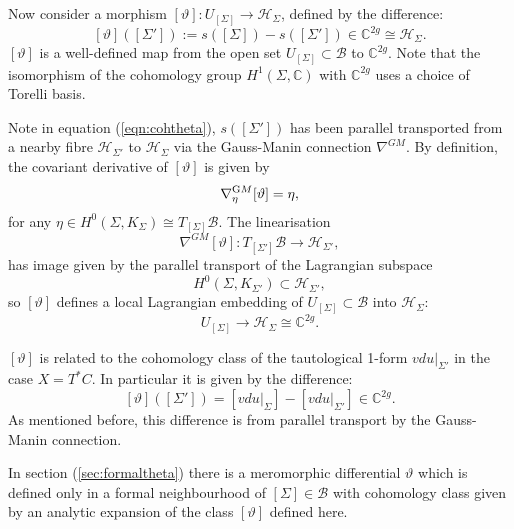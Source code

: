     Now consider a morphism \([\vartheta]:U_{[\Sigma]}\rightarrow \mathcal{H}_\Sigma\), defined by the difference:
    \begin{equation}  
    \label{eqn:cohtheta}
    [\vartheta]([\Sigma']):=s([\Sigma])-s([\Sigma'])\in\mathbb{C}^{2g}\cong \mathcal{H}_\Sigma.
    \end{equation}
    \( [\vartheta ]\) is a well-defined map from  the open set \(U_{[\Sigma]}\subset\mathcal{B}\) to \(\mathbb{C}^{2g}\). Note that the isomorphism of the cohomology group \(H^1(\Sigma, \mathbb{C})\) with \( \mathbb{C}^{2g}\) uses a choice of Torelli basis. 
    
    Note in equation (\ref{eqn:cohtheta}), \(s([\Sigma'])\) has been parallel transported from a nearby fibre \(\mathcal{H}_{\Sigma'}\) to \(  \mathcal{H}_\Sigma\) via the Gauss-Manin connection \( \nabla^{GM}\). By definition, the covariant derivative of \( [\vartheta]\) is given by
    \[ \nabla^{\text GM}_\eta[\vartheta]=\eta, \]
    for any \(\eta\in H^0(\Sigma, K_{\Sigma})\cong T_{[\Sigma]}\mathcal{B}\).  The linearisation 
    \[ \nabla^{GM}[\vartheta] : T_{[\Sigma']}\mathcal{B} \rightarrow \mathcal{H}_{\Sigma'}, \] 
    has image given by the parallel transport of the Lagrangian subspace \[ H^0(\Sigma, K_{\Sigma'})\subset \mathcal{H}_{\Sigma'},\] 
    so \( [\vartheta]\) defines a local Lagrangian embedding of \( U_{[\Sigma]} \subset\mathcal{B} \)  into \(\mathcal{H}_\Sigma\):
    \begin{equation}  \label{eqn:Bemb}
    U_{[\Sigma]} {\longrightarrow}\mathcal{H}_\Sigma\cong\mathbb{C}^{2g}.
    \end{equation}
    
    \([\vartheta]\) is related to the cohomology class of the tautological 1-form \( vdu|_{\Sigma'}\) in the case \(X=T^*C\). In particular it is given by the difference:
    \[ [\vartheta]([\Sigma'])=\left[vdu|_{\Sigma}\right]-\left[vdu|_{\Sigma'}\right]\in\mathbb{C}^{2g}.\]
    As mentioned before, this difference is from parallel transport by the Gauss-Manin connection.  
    
    In section (\ref{sec:formaltheta}) there is a meromorphic differential \(\vartheta\) which is defined only in a formal neighbourhood of \([\Sigma]\in\mathcal{B}\) with cohomology class given by an analytic expansion of the class \( [\vartheta]\) defined here.
    
